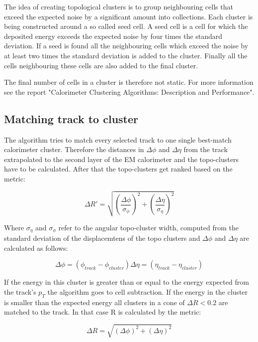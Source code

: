 The idea of creating topological clusters is to group neighbouring cells that exceed the expected noise by a significant amount into collections. 
Each cluster is being constructed around a so called seed cell. A seed cell is a cell for which the deposited energy exceeds the expected noise by four times the standard deviation. If a seed is found all the neighbouring cells which exceed the noise by at least two times the standard deviation is added to the cluster. Finally all the cells neighbouring these cells are also added to the final cluster.

The final number of cells in a cluster is therefore not static. For more information see the report "Calorimeter Clustering Algorithms: Description and Performance"\cite{cluster08}.


\subsection{Matching track to cluster}

The algorithm tries to match every selected track to one single best-match calorimeter cluster. 
Therefore the distances in $\Delta \phi$ and $\Delta \eta$ from the track extrapolated to the second layer of the EM calorimeter and the topo-clusters have to be calculated. After that the topo-clusters get ranked based on the metric:

\begin{equation}
\Delta R' = \sqrt{\left(\frac{\Delta \phi}{\sigma_{\phi}}\right)^2+\left(\frac{\Delta \eta}{\sigma_{\eta}}\right)^2}
\end{equation}

Where $\sigma_{\eta}$ and $\sigma_{\phi}$ refer to the angular topo-cluster width, computed from the standard deviation of the displacemtens of the topo clusters and $\Delta \phi$ and $\Delta \eta$ are calculated as follows:

\begin{equation}
\Delta \phi = (\phi_{track} - \phi_{cluster})
\Delta \eta = (\eta_{track} - \eta_{cluster})
\end{equation}

If the energy in this cluster is greater than or equal to the energy expected from the track's $p_T$ the algorithm goes to cell subtraction. If the energy in the cluster is smaller than the expected energy all clusters in a cone of $\Delta R < 0.2$ are matched to the track. In that case R is calculated by the metric:

\begin{equation}
\Delta R = \sqrt{(\Delta \phi)^2 + (\Delta \eta)^2}
\end{equation}

